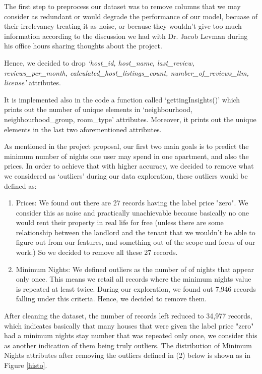 \documentclass[a4paper,12pt]{article}
\begin{document}
The first step to preprocess our dataset was to remove columns that we may consider as redundant or would degrade the performance of our model, becuase of their irrelevancy treating it as noise, or because they wouldn't give too much information according to the discussion we had with Dr. Jacob Levman during his office hours sharing thoughts about the project.

Hence, we decided to drop \textit{`host\_id, host\_name, last\_review, reviews\_per\_month, calculated\_host\_listings\_count, number\_of\_reviews\_ltm, license'} attributes.

It is implemented also in the code a function called `gettingInsights()' which prints out the number of unique elements in `neighbourhood, neighbourhood\_group, room\_type' attributes. Moreover, it prints out the unique elements in the last two aforementioned attributes. 

As mentioned in the project proposal, our first two main goals is to predict the minimum number of nights one user may spend in one apartment, and also the prices. In order to achieve that with higher accuracy, we decided to remove what we considered as `outliers' during our data exploration, these outliers would be defined as:

\begin{enumerate}
    \item Prices: We found out there are 27 records having the label price "zero". We consider this as noise and practically unachievable because basically no one would rent their property in real life for free (unless there are some relationship between the landlord and the tenant that we wouldn't be able to figure out from our features, and something out of the scope and focus of our work.) So we decided to remove all these 27 records.

    \item Minimum Nights: We defined outliers as the number of of nights that appear only once. This means we retail all records where the minimum nights value is repeated at least twice. During our exploration, we found out 7,946 records falling under this criteria. Hence, we decided to remove them.
\end{enumerate}

After cleaning the dataset, the number of records left reduced to 34,977 records, which indicates basically that many houses that were given the label price "zero" had a minimum nights stay number that was repeated only once, we consider this as another indication of them being truly outliers. The distribution of Minimum Nights attributes after removing the outliers defined in (2) below is shown as in Figure \ref{histo}. \newline
\end{document}
